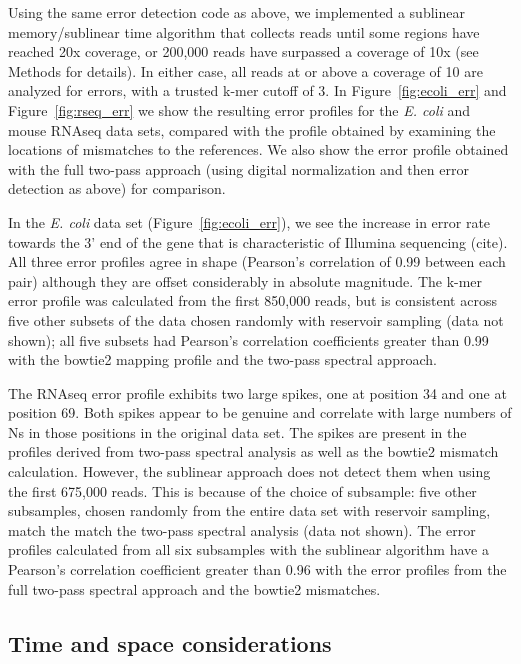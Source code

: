 \documentclass{article}
\begin{document}
Using the same error detection code as above, we implemented a
sublinear memory/sublinear time algorithm that collects reads until
some regions have reached 20x coverage, or 200,000 reads have
surpassed a coverage of 10x (see Methods for details).  In either
case, all reads at or above a coverage of 10 are analyzed for errors,
with a trusted k-mer cutoff of 3.  In Figure~\ref{fig:ecoli_err} and
Figure~\ref{fig:rseq_err} we show the resulting error profiles for the
{\em E. coli} and mouse RNAseq data sets, compared with the profile
obtained by examining the locations of mismatches to the references.
We also show the error profile obtained with the full two-pass approach
(using digital normalization and then error detection as above)
for comparison.

In the {\em E. coli} data set (Figure~\ref{fig:ecoli_err}), we see the
increase in error rate towards the 3' end of the gene that is
characteristic of Illumina sequencing (cite).  All three error
profiles agree in shape (Pearson's correlation of 0.99 between each
pair) although they are offset considerably in absolute magnitude.
The k-mer error profile was calculated from the first 850,000 reads, but
is consistent across five other subsets of the data chosen randomly
with reservoir sampling (data not shown); all five subsets had
Pearson's correlation coefficients greater than 0.99 with the
bowtie2 mapping profile and the two-pass spectral approach.

The RNAseq error profile exhibits two large spikes, one at position 34
and one at position 69.  Both spikes appear to be genuine and
correlate with large numbers of Ns in those positions in the original
data set.  The spikes are present in the profiles derived from
two-pass spectral analysis as well as the bowtie2 mismatch
calculation.  However, the sublinear approach does not detect them
when using the first 675,000 reads.  This is because of the choice of
subsample: five other subsamples, chosen randomly from the entire data
set with reservoir sampling, match the match the two-pass spectral
analysis (data not shown).  The error profiles calculated from all six
subsamples with the sublinear algorithm have a Pearson's correlation
coefficient greater than 0.96 with the error profiles from the full
two-pass spectral approach and the bowtie2 mismatches.


\subsection{Time and space considerations}
\end{document}
